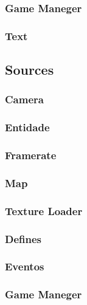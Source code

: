 \subsubsection{Game Maneger}

\subsubsection{Text}


\subsection{Sources}\label{.cpp}

\subsubsection{Camera}

\subsubsection{Entidade}

\subsubsection{Framerate}

\subsubsection{Map}

\subsubsection{Texture Loader}

\subsubsection{Defines}

\subsubsection{Eventos}

\subsubsection{Game Maneger}


